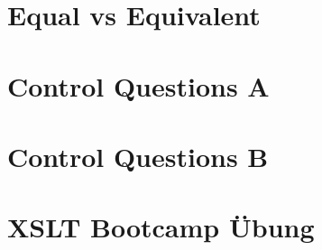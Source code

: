 \documentclass[11pt,DIV=15]{scrreprt}
\begin{document}
\section{Equal vs Equivalent}


\section{Control Questions A}


\section{Control Questions B}











\section{XSLT Bootcamp Übung}













\end{document}
